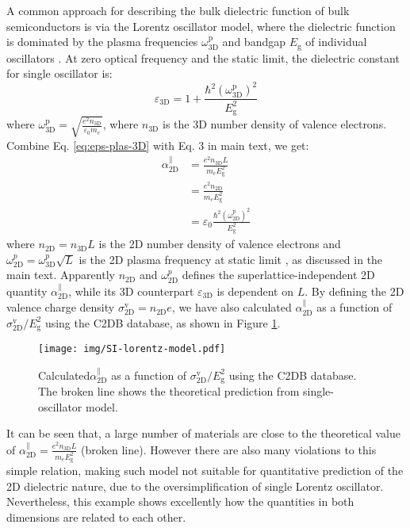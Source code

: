 \documentclass[manuscript=suppinfo,email=true,hyperref=true,keywords=false]{achemso}
\begin{document}
A common approach for describing the bulk dielectric function of bulk
semiconductors is via the Lorentz oscillator model, where the
dielectric function is dominated by the plasma frequencies
$\omega_{\mathrm{3D}}^{\mathrm{p}}$ and bandgap $E_{\mathrm{g}}$ of
individual oscillators \cite{ketterson_physics_2016}. At zero optical
frequency and the static limit, the dielectric constant for single
oscillator is:
\begin{equation}
  \label{eq:eps-plas-3D}
  \varepsilon_{\mathrm{3D}} = 1 +
  \frac{\hbar^{2} (\omega_{\mathrm{3D}}^{\mathrm{p}})^{2}}{E_{\mathrm{g}}^{2}}
\end{equation}
where
$\omega_{\mathrm{3D}}^{\mathrm{p}} = {\displaystyle \sqrt{\frac{e^{2}
      n_{\mathrm{3D}}}{\varepsilon_{0} m_{e}}}}$, where
$n_{\mathrm{3D}}$ is the 3D number density of valence
electrons. Combine Eq. \ref{eq:eps-plas-3D} with Eq. 3 in main text,
we get:
\begin{equation}
  \begin{aligned}
  \label{eq:alpha-plas}
  \alpha_{\mathrm{2D}}^{\parallel} &= \frac{e^{2} n_{\mathrm{3D}} L}{m_{e} E_{\mathrm{g}}^{2}} \\
  &= \frac{e^{2} n_{\mathrm{2D}}}{m_{e} E_{\mathrm{g}}^{2}} \\
  &= \varepsilon_{0} \frac{\hbar^{2}
    (\omega_{\mathrm{2D}}^{\mathrm{p}})^{2}}{E_{\mathrm{g}}^{2}}
\end{aligned}
\end{equation}
where $n_{\mathrm{2D}} =n_{\mathrm{3D}} L$ is the 2D number density of
valence electrons and
$\omega_{\mathrm{2D}}^{p}=\omega_{\mathrm{3D}}^{p}\sqrt{L}$ is the 2D
plasma frequency at static limit \cite{Nazarov_2015_2D_3D}, as
discussed in the main text. Apparently $n_{\mathrm{2D}}$ and
$\omega_{\mathrm{2D}}^{p}$ defines the superlattice-independent 2D
quantity $\alpha_{\mathrm{2D}}^{\parallel}$, while its 3D counterpart
$\varepsilon_{\mathrm{3D}}$ is dependent on $L$. By defining the 2D
valence charge density
$\sigma_{\mathrm{2D}}^{\mathrm{v}}=n_{\mathrm{2D}}e$, we have also
calculated $\alpha_{\mathrm{2D}}^{\parallel}$ as a function of
$\sigma_{\mathrm{2D}}^{\mathrm{v}}/E_{\mathrm{g}}^{2}$ using the C2DB database, as shown in Figure \ref{fig:plasma}.
\begin{figure}[htbp]
  \centering
  \texttt{[image: img/SI-lorentz-model.pdf]}
  \caption{Calculated$\alpha_{\mathrm{2D}}^{\parallel}$ as a function of
    $\sigma_{\mathrm{2D}}^{\mathrm{v}}/E_{\mathrm{g}}^{2}$ using the
    C2DB database. The broken line shows the theoretical prediction
    from single-oscillator model.}
  \label{fig:plasma}
\end{figure}
It can be seen that, a large number of materials are close to the
theoretical value of
$\alpha_{\mathrm{2D}}^{\parallel} = \frac{e^{2} n_{\mathrm{3D}} L}{m_{e}
  E_{\mathrm{g}}^{2}}$ (broken line). However there are also many
violations to this simple relation, making such model not suitable for
quantitative prediction of the 2D dielectric nature, due to the
oversimplification of single Lorentz oscillator. Nevertheless, this
example shows excellently how the quantities in both dimensions are
related to each other.
\end{document}
